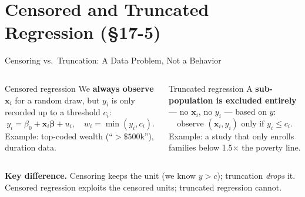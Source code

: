 \documentclass[aspectratio=169, 12pt]{beamer}
\newcommand{\xib}{\mathbf{x}_i\boldsymbol{\beta}}    %
\begin{document}
\section{Censored and Truncated Regression (\S17-5)}

\begin{frame}[shrink=10]{Censoring vs.\ Truncation: A Data Problem, Not a Behavior}

  \begin{columns}[t]
    \begin{definitionbox}{Censored regression}
      We \textbf{always observe $\mathbf{x}_i$} for a random draw, but $y_i$ is
      only recorded up to a threshold $c_i$:
      \[
        y_i = \beta_0 + \xib + u_i, \quad w_i = \min(y_i, c_i).
      \]
      Example: top-coded wealth (``$> \$500\text{k}$''), duration data.
    \end{definitionbox}

    \begin{definitionbox}{Truncated regression}
      A \textbf{sub-population is excluded entirely} --- no $\mathbf{x}_i$, no
      $y_i$ --- based on $y$:
      \[
        \text{observe }(\mathbf{x}_i,y_i)\text{ only if } y_i \le c_i.
      \]
      Example: a study that only enrolls families below 1.5$\times$ the poverty line.
    \end{definitionbox}
  \end{columns}

  \smallskip

  \begin{keybox}
    \textbf{Key difference.} Censoring keeps the unit (we know $y>c$);
    truncation \emph{drops} it. Censored regression exploits the censored units;
    truncated regression cannot.
  \end{keybox}

\end{frame}
\end{document}
